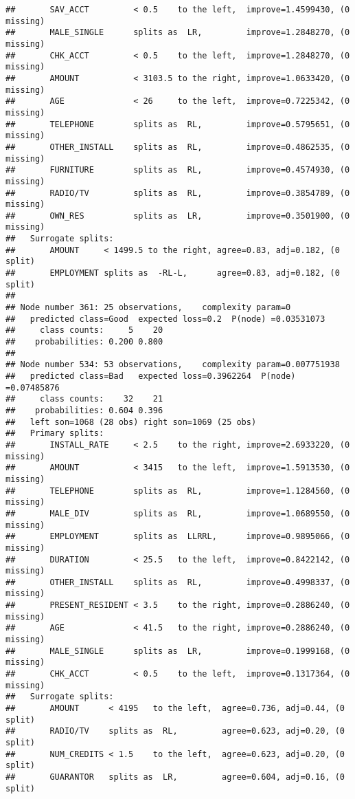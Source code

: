 \documentclass[
]{article}
\begin{document}
\begin{verbatim}
##       SAV_ACCT         < 0.5    to the left,  improve=1.4599430, (0 missing)
##       MALE_SINGLE      splits as  LR,         improve=1.2848270, (0 missing)
##       CHK_ACCT         < 0.5    to the left,  improve=1.2848270, (0 missing)
##       AMOUNT           < 3103.5 to the right, improve=1.0633420, (0 missing)
##       AGE              < 26     to the left,  improve=0.7225342, (0 missing)
##       TELEPHONE        splits as  RL,         improve=0.5795651, (0 missing)
##       OTHER_INSTALL    splits as  RL,         improve=0.4862535, (0 missing)
##       FURNITURE        splits as  RL,         improve=0.4574930, (0 missing)
##       RADIO/TV         splits as  RL,         improve=0.3854789, (0 missing)
##       OWN_RES          splits as  LR,         improve=0.3501900, (0 missing)
##   Surrogate splits:
##       AMOUNT     < 1499.5 to the right, agree=0.83, adj=0.182, (0 split)
##       EMPLOYMENT splits as  -RL-L,      agree=0.83, adj=0.182, (0 split)
## 
## Node number 361: 25 observations,    complexity param=0
##   predicted class=Good  expected loss=0.2  P(node) =0.03531073
##     class counts:     5    20
##    probabilities: 0.200 0.800 
## 
## Node number 534: 53 observations,    complexity param=0.007751938
##   predicted class=Bad   expected loss=0.3962264  P(node) =0.07485876
##     class counts:    32    21
##    probabilities: 0.604 0.396 
##   left son=1068 (28 obs) right son=1069 (25 obs)
##   Primary splits:
##       INSTALL_RATE     < 2.5    to the right, improve=2.6933220, (0 missing)
##       AMOUNT           < 3415   to the left,  improve=1.5913530, (0 missing)
##       TELEPHONE        splits as  RL,         improve=1.1284560, (0 missing)
##       MALE_DIV         splits as  RL,         improve=1.0689550, (0 missing)
##       EMPLOYMENT       splits as  LLRRL,      improve=0.9895066, (0 missing)
##       DURATION         < 25.5   to the left,  improve=0.8422142, (0 missing)
##       OTHER_INSTALL    splits as  RL,         improve=0.4998337, (0 missing)
##       PRESENT_RESIDENT < 3.5    to the right, improve=0.2886240, (0 missing)
##       AGE              < 41.5   to the right, improve=0.2886240, (0 missing)
##       MALE_SINGLE      splits as  LR,         improve=0.1999168, (0 missing)
##       CHK_ACCT         < 0.5    to the left,  improve=0.1317364, (0 missing)
##   Surrogate splits:
##       AMOUNT      < 4195   to the left,  agree=0.736, adj=0.44, (0 split)
##       RADIO/TV    splits as  RL,         agree=0.623, adj=0.20, (0 split)
##       NUM_CREDITS < 1.5    to the left,  agree=0.623, adj=0.20, (0 split)
##       GUARANTOR   splits as  LR,         agree=0.604, adj=0.16, (0 split)

\end{verbatim}
\end{document}
